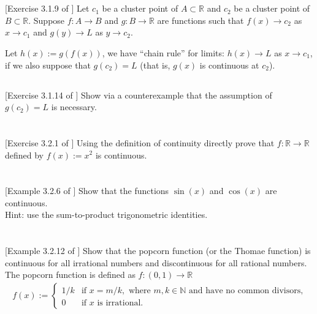 \documentclass[11pt,letterpaper]{article}
\begin{document}
\section{} 
\subsection{}[Exercise 3.1.9 of \cite{Lebl_23}] 
Let $c_1$ be a cluster point of $A\subset\mathbb{R}$ and $c_2$ be a cluster point of $B\subset\mathbb{R}$. Suppose $f:A\to B$
and $g:B\to \mathbb{R}$ are functions such that $f(x)\to c_2$ as $x\to c_1$ and $g(y)\to L$ as $y\to c_2$. 

Let $h(x):= g(f(x))$, we have ``chain rule'' for limits: $h(x)\to L$ as $x\to c_1$, if we also suppose that $g(c_2)=L$ (that is, $g(x)$ is continuous at $c_2$).

\subsection{}[Exercise 3.1.14 of \cite{Lebl_23}] 
Show via a counterexample that the assumption of $g(c_2)=L$ is necessary.

\section{} [Exercise 3.2.1 of \cite{Lebl_23}] 
Using the definition of continuity directly prove that $f: \mathbb{R}\to \mathbb{R}$ defined by $f(x) := x^2$ is continuous.

\section{} [Example 3.2.6 of \cite{Lebl_23}] 
Show that the functions $\sin(x)$ and $\cos(x)$ are continuous. \\
Hint: use the sum-to-product trigonometric identities.

\section{} [Example 3.2.12 of \cite{Lebl_23}] 
Show that the popcorn function (or the Thomae function) is continuous for all irrational numbers and discontinuous for all rational numbers. The popcorn function is defined as $f:(0,1)\to \mathbb{R}$
\begin{align}
    f(x) := \begin{cases}
        1/k & \text{if } x=m/k, \text{ where }m,k\in\mathbb{N}\text{ and have no common divisors,}\\
        0 & \text{if }x\text{ is irrational.}
    \end{cases}
\end{align}
\end{document}
